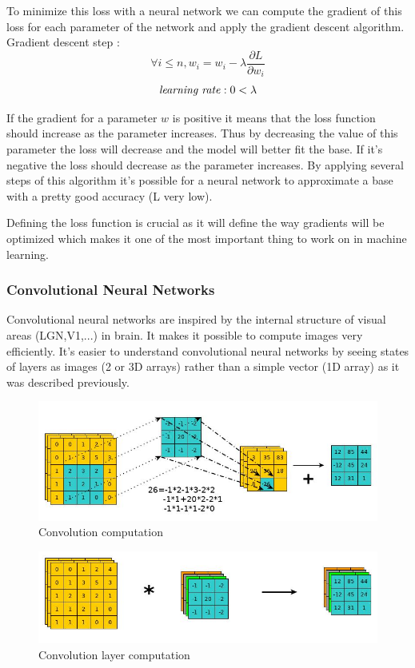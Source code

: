 \documentclass[11pt]{article}
\begin{document}
To minimize this loss with a neural network we can compute the gradient of this loss for each parameter of the network and apply the gradient descent algorithm.
Gradient descent step :
$$\forall i\le n, w_i = w_i - \lambda  \frac{\partial L}{\partial w_i}$$
$$ \mbox{\emph{learning rate}} : 0<\lambda$$

If the gradient for a parameter $w$ is positive it means that the loss function should increase as the parameter increases. Thus by decreasing the value of this parameter the loss will decrease and the model will better fit the base. If it's negative the loss should decrease as the parameter increases.
By applying several steps of this algorithm it's possible for a neural network to approximate a base with a pretty good accuracy (L very low).

Defining the loss function is crucial as it will define the way gradients will be optimized which makes it one of the most important thing to work on in machine learning.


\subsubsection{Convolutional Neural Networks}
Convolutional neural networks are inspired by the internal structure of visual areas (LGN,V1,...) in brain. It makes it possible to compute images very efficiently. It's easier to understand convolutional neural networks by seeing states of layers as images (2 or 3D arrays) rather than a simple vector (1D array) as it was described previously.\newpage
\begin{figure}[!h]
\centering
\includegraphics[scale=0.40]{conv.jpg}
\caption{Convolution computation}
\label{conv}
\end{figure}

\begin{figure}[!h]
\centering
\includegraphics[scale=0.40]{conv2.jpg}
\caption{Convolution layer computation}
\label{conv2}
\end{figure}
\end{document}
